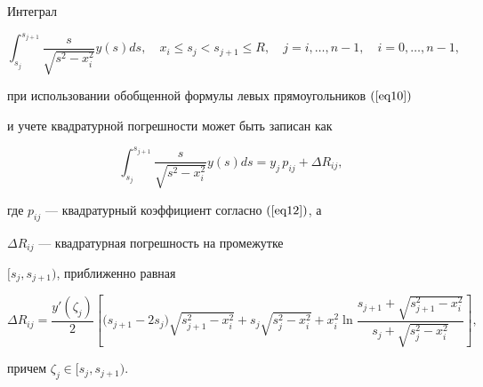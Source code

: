 \begin{lem}


Интеграл


\begin{equation}


\label{eq18}


\int_{s_j}^{s_{j+1}}\frac{s}{\sqrt{s^2-x_i^2}}y(s)ds, \quad


x_i\le s_j<s_{j+1}\le R, \quad j=i,\dotsc,n-1, \quad i=0,\dotsc,n-1,


\end{equation}


при использовании обобщенной формулы левых прямоугольников $(\ref{eq10})$


и учете квадратурной погрешности может быть записан как


\begin{equation}


\label{eq19}


\int_{s_j}^{s_{j+1}}\frac{s}{\sqrt{s^2-x_i^2}}y(s)ds=


y_j\,p_{ij}+\Delta R_{ij},


\end{equation}


где $p_{ij}$ --- квадратурный коэффициент согласно $(\ref{eq12})$, а


$\Delta R_{ij}$ --- квадратурная погрешность на промежутке


$[s_j,s_{j+1})$, приближенно равная


\begin{equation}


\label{eq20}


\Delta R_{ij}=\frac{y'(\zeta_j)}2\left[\big(s_{j+1}-2s_j\big)


\sqrt{s_{j+1}^2-x_i^2}+s_j\sqrt{s_j^2-x_i^2}+


x_i^2\ln\frac{s_{j+1}+\sqrt{s_{j+1}^2-x_i^2}}


{s_j+\sqrt{s_j^2-x_i^2}}\right],


\end{equation}


причем $\zeta_j\in[s_j,s_{j+1})$.


\end{lem}





